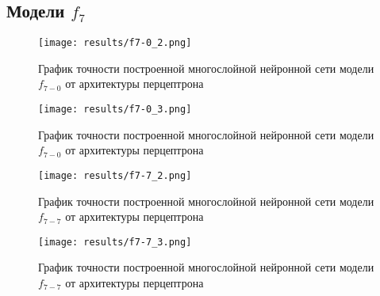 
\subsection{Модели $f_{7}$}

\bigskip


\begin{figure}[H]
	\texttt{[image: results/f7-0\_2.png]}
	
	\caption{График точности построенной многослойной нейронной сети модели $f_{7-0}$ от архитектуры перцептрона}
	
\end{figure}


\begin{figure}[H]
	\texttt{[image: results/f7-0\_3.png]}
	
	\caption{График точности построенной многослойной нейронной сети модели $f_{7-0}$ от архитектуры перцептрона}
\end{figure}



\bigskip


\begin{figure}[H]
	\texttt{[image: results/f7-7\_2.png]}
	
	\caption{График точности построенной многослойной нейронной сети модели $f_{7-7}$ от архитектуры перцептрона}
	
\end{figure}


\begin{figure}[H]
	\texttt{[image: results/f7-7\_3.png]}
	
	\caption{График точности построенной многослойной нейронной сети модели $f_{7-7}$ от архитектуры перцептрона}
\end{figure}


